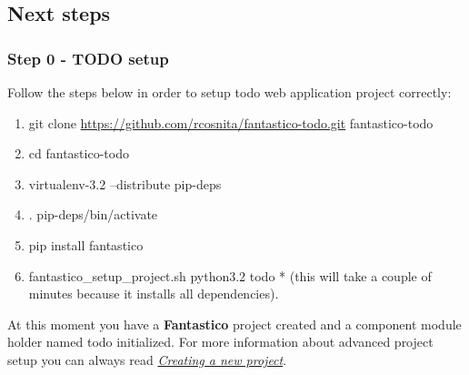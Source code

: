 \documentclass[letterpaper,10pt,english]{sphinxmanual}
\begin{document}
\subsection{Next steps}
\label{how_to/todo/index:next-steps}

\subsubsection{Step 0 - TODO setup}
\label{how_to/todo/setup::doc}\label{how_to/todo/setup:step-0-todo-setup}
Follow the steps below in order to setup todo web application project correctly:
\begin{enumerate}
\item {} 
git clone \href{https://github.com/rcosnita/fantastico-todo.git}{https://github.com/rcosnita/fantastico-todo.git} fantastico-todo

\item {} 
cd fantastico-todo

\item {} 
virtualenv-3.2 --distribute pip-deps

\item {} 
. pip-deps/bin/activate

\item {} 
pip install fantastico

\item {} 
fantastico\_setup\_project.sh python3.2 todo
* (this will take a couple of minutes because it installs all dependencies).

\end{enumerate}

At this moment you have a \textbf{Fantastico} project created and a component module holder named todo initialized.
For more information about advanced project setup you can always read {\hyperref[how_to/new_project_how_to::doc]{\emph{Creating a new project}}}.
\end{document}
